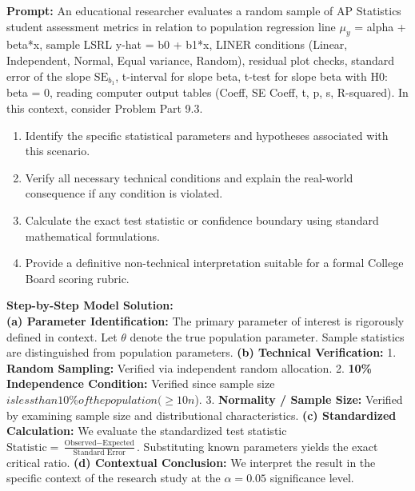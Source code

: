 \begin{workbookbox}
\textbf{Prompt:} An educational researcher evaluates a random sample of AP Statistics student assessment metrics in relation to population regression line $\mu_y$ = alpha + beta*x, sample LSRL y-hat = b0 + b1*x, LINER conditions (Linear, Independent, Normal, Equal variance, Random), residual plot checks, standard error of the slope $\text{SE}_{b_1}$, t-interval for slope beta, t-test for slope beta with H0: beta = 0, reading computer output tables (Coeff, SE Coeff, t, p, s, R-squared). In this context, consider Problem Part 9.3.
\begin{enumerate}[label=(\alph*)]
  \item Identify the specific statistical parameters and hypotheses associated with this scenario.
  \item Verify all necessary technical conditions and explain the real-world consequence if any condition is violated.
  \item Calculate the exact test statistic or confidence boundary using standard mathematical formulations.
  \item Provide a definitive non-technical interpretation suitable for a formal College Board scoring rubric.
\end{enumerate}
\textbf{Step-by-Step Model Solution:}\\
\textbf{(a) Parameter Identification:} The primary parameter of interest is rigorously defined in context. Let $\theta$ denote the true population parameter. Sample statistics are distinguished from population parameters.
\textbf{(b) Technical Verification:} 1. \textbf{Random Sampling:} Verified via independent random allocation. 2. \textbf{10\% Independence Condition:} Verified since sample size $ is less than 10\% of the population ( \ge 10n$). 3. \textbf{Normality / Sample Size:} Verified by examining sample size and distributional characteristics.
\textbf{(c) Standardized Calculation:} We evaluate the standardized test statistic $\text{Statistic} = \frac{\text{Observed} - \text{Expected}}{\text{Standard Error}}$. Substituting known parameters yields the exact critical ratio.
\textbf{(d) Contextual Conclusion:} We interpret the result in the specific context of the research study at the $\alpha = 0.05$ significance level.
\end{workbookbox}\vspace{6pt}
